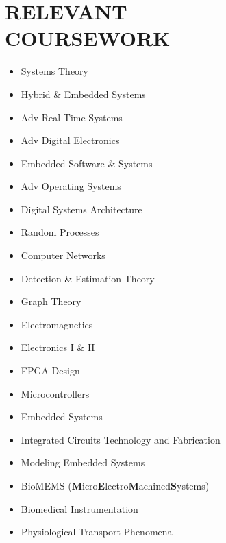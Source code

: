 \documentclass[10pt,a4paper,sans]{moderncv}
\begin{document}
  \section{RELEVANT \\ COURSEWORK} 
  \begin{multicols}{2} 
    \begin{itemize} \itemsep -2pt
    \item Systems Theory
    \item Hybrid \& Embedded Systems
    \item Adv Real-Time Systems
    \item Adv Digital Electronics
    \item Embedded Software \& Systems
    \item Adv Operating Systems
    \item Digital Systems Architecture
    \item Random Processes
    \item Computer Networks
    \item Detection \& Estimation Theory
    \item Graph Theory
    \item Electromagnetics
    \item Electronics I \& II
    \item FPGA Design
    \item Microcontrollers
    \item Embedded Systems
    \item Integrated Circuits Technology and Fabrication
    \item Modeling Embedded Systems
    \item BioMEMS (\textbf{M}icro\textbf{E}lectro\textbf{M}achined\textbf{S}ystems)
    \item Biomedical Instrumentation
    \item Physiological Transport Phenomena
    \end{itemize}
  \end{multicols}
  \fi
\end{document}
